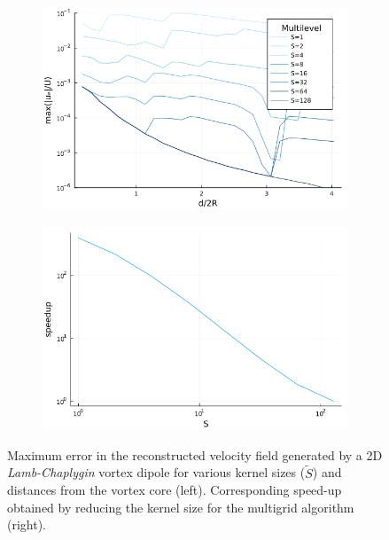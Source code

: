 \documentclass{article}
\begin{document}
\begin{figure}
    \centering
    \begin{subfigure}{.5\textwidth}
        \centering
        \includegraphics[width=\textwidth]{tex//fig/lamb_dipole_error_dists.png}
    \end{subfigure}%
    \begin{subfigure}{.5\textwidth}
        \centering
        \includegraphics[width=\textwidth]{tex/fig/lamb_dipole_speedup_dists.png}
    \end{subfigure}
    \caption{Maximum error in the reconstructed velocity field generated by a 2D \emph{Lamb-Chaplygin} vortex dipole for various kernel sizes ($\tilde{S}$) and distances from the vortex core (left). Corresponding speed-up obtained by reducing the kernel size for the multigrid algorithm (right).}
    \label{fig:error_lamb_2}
\end{figure}
\end{document}
